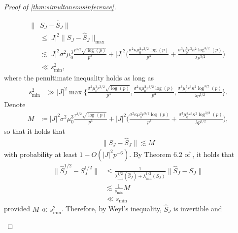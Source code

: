 \documentclass[10pt]{article}
\newcommand{\0}{{\mathbf{0}}}
\newcommand{\1}{{\mathbf{1}}}
\renewcommand{\citet}{\cite}
\renewcommand{\hat}{\widehat}
\renewcommand{\hat}{\widehat}
\begin{document}
\begin{proof}[Proof of \cref{thm:simultaneousinference}]
\begin{itemize}
\begin{align*}
    \| &S_J - \hat S_J \| \\
    &\leq |J|^2 \| S_J - \hat S_J \|_{\max} \\
    &\lesssim %
    |J|^2 \sigma^2 \mu_0^3 \frac{ r^{3/2} \sqrt{\log(p)}}{p^3}  + |J|^2\bigg( \frac{\sigma^2 \kappa \mu_0^2 r^{3/2} \log(p)}{p^3} + \frac{\sigma^3 \mu_0^5 r^3 \kappa^2 \log^{3/2}(p)}{\lambda p^{3/2}} \bigg) \\
    &\ll s^2_{\min}, %
\end{align*}
where the penultimate inequality holds as long as 
\begin{align}
    s_{\min}^2 &\gg |J|^2 \max\bigg\{ \frac{\sigma^2 \mu_0^3 r^{3/2} \sqrt{\log(p)}}{p^3}, \frac{\sigma^2 \kappa \mu_0^2 r^{3/2} \log(p)}{p^3}, \frac{\sigma^3 \mu_0^5 r^3 \kappa^2 \log^{3/2}(p)}{\lambda p^{3/2}} \bigg\}. \label{sminsecond}
\end{align}
Denote
\begin{align}
    M &\coloneqq %
    |J|^2 \sigma^2 \mu_0^3 \frac{ r^{3/2} \sqrt{\log(p)}}{p^3} %
    + |J|^2\bigg( \frac{\sigma^2 \kappa \mu_0^2 r^{3/2} \log(p)}{p^3} 
     + \frac{\sigma^3 \mu_0^5 r^3 \kappa^2 \log^{3/2}(p)}{\lambda p^{3/2}} \bigg), \label{Mdef}
\end{align}
so that it holds that
\begin{align*}
    \| S_J - \hat S_J \| \lesssim M
\end{align*}
with probability at least $1 - O(|J|^2 p^{-6})$.  By Theorem 6.2 of \citet{higham_functions_2008}, it holds that
\begin{align*}
    \| \hat S_J^{1/2} - S_J^{1/2} \| &\leq \frac{1}{ \lambda_{\min}^{1/2}(\hat S_J) + \lambda_{\min}^{1/2}(S_J)} \| \hat S_J - S_J \| \\
    &\lesssim \frac{1}{s_{\min}} M \\
    &\ll s_{\min}
\end{align*}
provided $M \ll s^2_{\min}$. Therefore, by Weyl's inequality, $\hat S_J$ is invertible and

\end{itemize}
\end{proof}
\end{document}
